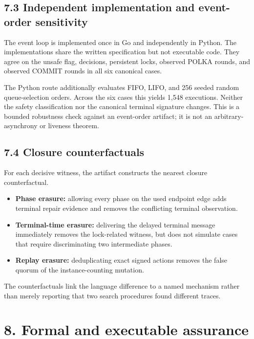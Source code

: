 \documentclass[10pt,a4paper]{article}
\newcommand{\tightlist}{\setlength{\itemsep}{0pt}\setlength{\parskip}{0pt}}
\begin{document}
\subsection{7.3 Independent implementation and event-order
sensitivity}\label{independent-implementation-and-event-order-sensitivity}

The event loop is implemented once in Go and independently in Python.
The implementations share the written specification but not executable
code. They agree on the unsafe flag, decisions, persistent locks,
observed POLKA rounds, and observed COMMIT rounds in all six canonical
cases.

The Python route additionally evaluates FIFO, LIFO, and 256 seeded
random queue-selection orders. Across the six cases this yields 1,548
executions. Neither the safety classification nor the canonical terminal
signature changes. This is a bounded robustness check against an
event-order artifact; it is not an arbitrary-asynchrony or liveness
theorem.

\subsection{7.4 Closure counterfactuals}\label{closure-counterfactuals}

For each decisive witness, the artifact constructs the nearest closure
counterfactual.

\begin{itemize}
\tightlist
\item
  \textbf{Phase erasure:} allowing every phase on the used endpoint edge
  adds terminal repair evidence and removes the conflicting terminal
  observation.
\item
  \textbf{Terminal-time erasure:} delivering the delayed terminal
  message immediately removes the lock-related witness, but does not
  simulate cases that require discriminating two intermediate phases.
\item
  \textbf{Replay erasure:} deduplicating exact signed actions removes
  the false quorum of the instance-counting mutation.
\end{itemize}

The counterfactuals link the language difference to a named mechanism
rather than merely reporting that two search procedures found different
traces.

\section{8. Formal and executable
assurance}\label{formal-and-executable-assurance}
\end{document}
